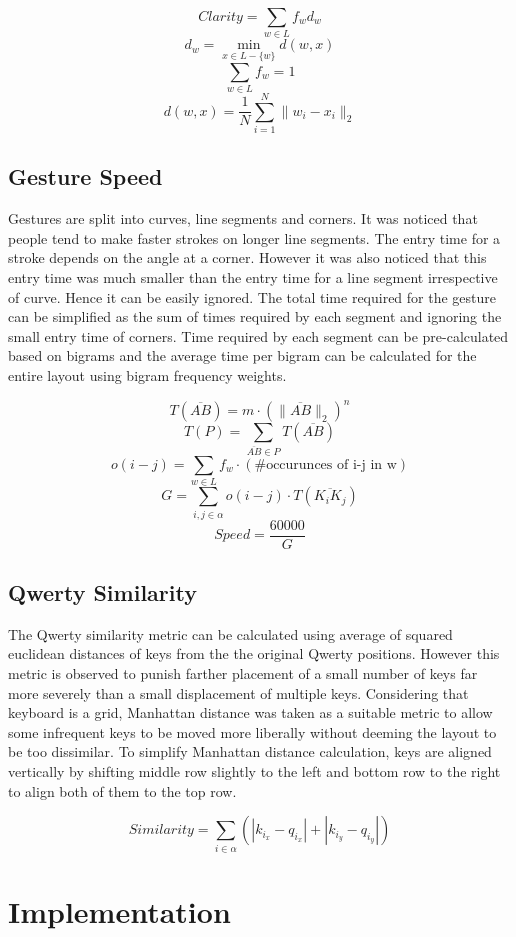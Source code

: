 \documentclass[MTech]{iitmdiss}
\begin{document}
\[Clarity=\sum_{w \in L} f_{w} d_{w}\]
\[ d_{w}= \min_{x \in L - \{w\} } d(w,x) \] 
\[ \sum_{w \in L } f_{w} = 1\]
\[ d(w,x) = \frac{1}{N} \sum_{i=1}^{N} \| w_{i} - x_{i} \|_{2} \]

\section{Gesture Speed}
Gestures are split into curves, line segments and corners. It was noticed that people tend to make faster strokes on longer line segments. The entry time for a stroke depends on the angle at a corner. However it was also noticed that this entry time was much smaller than the entry time for a line segment irrespective of curve. Hence it can be easily ignored. 
The total time required for the gesture can be simplified as the sum of times required by each segment and ignoring the small entry time of corners. 
Time required by each segment can be pre-calculated based on bigrams and the average time per bigram can be calculated for the entire layout using bigram frequency weights.

\[ T( \overline{AB} )= m \cdot (\| \overline{AB} \|_{2})^n   \]
\[ T(P)= \sum_{\overline{AB} \in P} T(\overline{AB}) \]
\[ o(i-j)= \sum_{w \in L} f_{w} \cdot (\text {\# occurunces of i-j in w}) \]
\[ G = \sum_{i,j \in \alpha} o(i-j) \cdot T(\overline{K_{i}K_{j}}) \]
\[ Speed = \frac{60000}{G} \]

\section{Qwerty Similarity}
The Qwerty similarity metric can be calculated using average of squared euclidean distances of keys from the the original Qwerty positions. However this metric is observed to punish farther placement of a small number of keys far more severely than a small displacement of multiple keys. Considering that keyboard is a grid, Manhattan distance was taken as a suitable metric to allow some infrequent keys to be moved more liberally without deeming the layout to be too dissimilar. To simplify Manhattan distance calculation, keys are aligned vertically by shifting middle row slightly to the left and bottom row to the right to align both of them to the top row.

\[ Similarity = \sum_{i \in \alpha} (|k_{i_{x}}-q_{i_{x}}| + |k_{i_{y}}-q_{i_{y}}|)\]

\chapter{Implementation}
\end{document}
